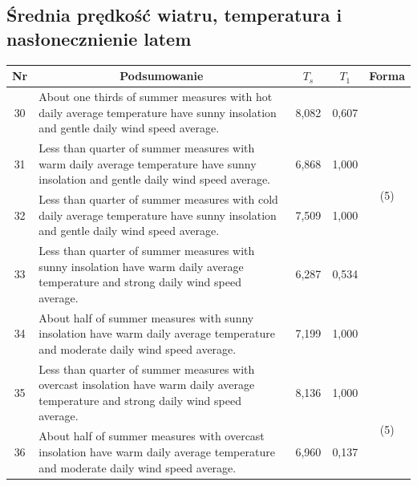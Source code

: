 \documentclass{classrep}
\begin{document}
\clearpage

\subsection{Średnia prędkość wiatru, temperatura i nasłonecznienie latem}

\begin{table}[H]
\begin{center}
\begin{tabularx}{\linewidth}{ |c|X|c|c|c| } 
\hline
Nr & \multicolumn{1}{|c|}{Podsumowanie} & $T_s$ & $T_1$ & Forma \\
\hline
30	&	About one thirds of summer measures with hot daily average temperature have sunny insolation and gentle daily wind speed average.	&	8,082	&	0,607& \multirow{3}{1em}{\newline\newline\newline\newline(5)} \\ \cline{1-4}	
31	&	Less than quarter of summer measures with warm daily average temperature have sunny insolation and gentle daily wind speed average.	&	6,868	&	1,000	& \\	\cline{1-4}
32	&	Less than quarter of summer measures with cold daily average temperature have sunny insolation and gentle daily wind speed average.	&	7,509 &	1,000	& \\	\hline\hline
33	&	Less than quarter of summer measures with sunny insolation have warm daily average temperature and strong daily wind speed average.	&	6,287	&	0,534	& \multirow{6}{1em}{\newline\newline\newline\newline\newline\newline\newline\newline\newline(5)} \\	\cline{1-4}
34	&	About half of summer measures with sunny insolation have warm daily average temperature and moderate daily wind speed average.	&	7,199	&	1,000	& \\	\cline{1-4}
35	&	Less than quarter of summer measures with overcast insolation have warm daily average temperature and strong daily wind speed average.	&	8,136	&	1,000	& \\	\cline{1-4}
36	&	About half of summer measures with overcast insolation have warm daily average temperature and moderate daily wind speed average.	&	6,960	&	0,137	& \\	\cline{1-4}

\end{tabularx}
\end{center}
\end{table}
\end{document}
